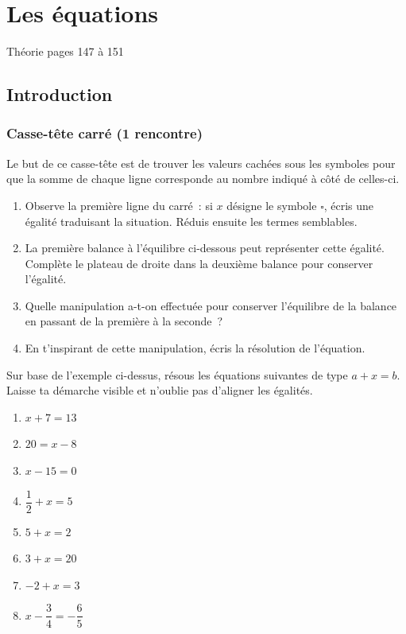 \documentclass[../math2.tex]{subfiles}
\begin{document}
\raggedbottom
{}
\chapter{Les équations}
 Théorie pages 147 à 151
\section{Introduction}
\subsection{Casse-tête carré (1\iere{} rencontre)}
\begin{center}
  
\end{center}

Le but de ce casse-tête est de trouver les valeurs cachées sous les
symboles pour que la somme de chaque ligne corresponde au nombre indiqué à côté de celles-ci.

\begin{enumerate}
  \item Observe la première ligne du carré~: si $x$ désigne le symbole $\square$, écris une égalité traduisant la situation. Réduis ensuite les termes
        semblables.\vspace*{2cm}
  \item La première balance à l'équilibre ci-dessous peut représenter cette égalité. Complète le plateau de droite dans la deuxième balance pour
        conserver l'égalité.
        \begin{center}
          \hfil
        \end{center}
  \item
        Quelle manipulation a-t-on effectuée pour conserver l'équilibre de la balance en passant de la première à la seconde~?
  \item
        En t'inspirant de cette manipulation, écris la résolution de l'équation.
        \vspace*{3cm}
\end{enumerate}

\begin{exercise}
  Sur base de l'exemple ci-dessus, résous les équations suivantes de type
  $a+x=b$. Laisse ta démarche visible et n'oublie pas d'aligner les égalités.
  \begin{enumerate}[cols=2, itemsep=3cm]
    \item $x + 7 = 13$
    \item $20 = x - 8$
    \item $x - 15 = 0$
    \item $\dfrac{1}{2} + x = 5$
    \item $5 + x = 2$
    \item $3 + x = 20$
    \item $-2 + x = 3$
    \item $ x -\dfrac{3}{4} = -\dfrac{6}{5}$
  \end{enumerate}
  \vspace*{3cm}
\end{exercise}
\end{document}
